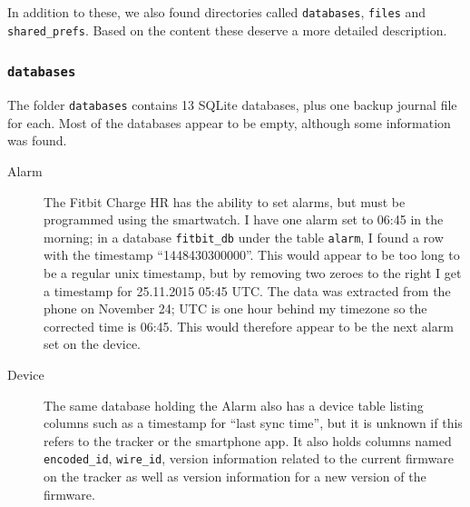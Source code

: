 \documentclass[a4paper,11pt,dvips]{article}
\begin{document}
\noindent
In addition to these, we also found directories called \texttt{databases}, \texttt{files} and \texttt{shared\_prefs}. Based on the content these deserve a more detailed description.

\subsubsection{\texttt{databases}}
The folder \texttt{databases} contains 13 SQLite databases, plus one backup journal file for each. Most of the databases appear to be empty, although some information was found.

\begin{description}
\item [Alarm] The Fitbit Charge HR has the ability to set alarms, but must be programmed using the smartwatch. I have one alarm set to 06:45 in the morning; in a database \texttt{fitbit\_db} under the table \texttt{alarm}, I found a row with the timestamp “1448430300000”. This would appear to be too long to be a regular unix timestamp, but by removing two zeroes to the right I get a timestamp for 25.11.2015 05:45 UTC. The data was extracted from the phone on November 24; UTC is one hour behind my timezone so the corrected time is 06:45. This would therefore appear to be the next alarm set on the device.
\item [Device] The same database holding the Alarm also has a device table listing columns such as a timestamp for “last sync time”, but it is unknown if this refers to the tracker or the smartphone app. It also holds columns named \texttt{encoded\_id}, \texttt{wire\_id}, version information related to the current firmware on the tracker as well as version information for a new version of the firmware.


\end{description}
\end{document}
